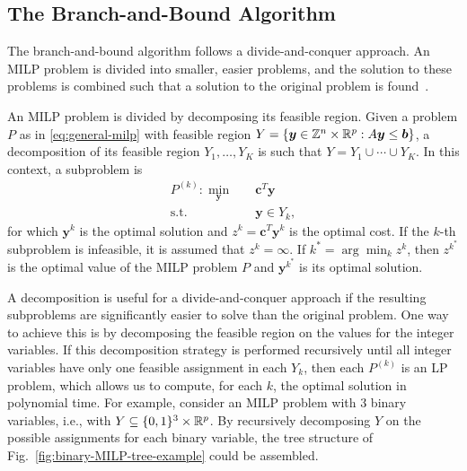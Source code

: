 	  \subsection{The Branch-and-Bound Algorithm}

	  The branch-and-bound algorithm follows a divide-and-conquer approach.
	  An MILP problem is divided into smaller, easier problems, and the
	  solution to these problems is combined such that a solution to the
	  original problem is found~\cite{wolseyIntegerProgramming1998}.

	  An MILP problem is divided by decomposing its feasible region.  Given
	  a problem $P$ as in \eqref{eq:general-milp} with feasible region
	  $Y=\{\bm{y}\in \mathbb{Z}^{n}\times \mathbb{R}^{p}: A\bm{y}\le \bm{b}\}$, a
	  decomposition of its feasible region $Y_1,\ldots,Y_K$ is such that
	  $Y=Y_1\cup \cdots\cup Y_K$.
In this context, a subproblem is
\begin{equation}\label{eq:milp-subproblem}
\begin{split}
    P^{(k)} : \min_{\bm{y}} \quad & \bm{c}^{T}\bm{y} \\
    \textrm{s.t.} \quad & \bm{y}\in Y_k
,\end{split}
\end{equation}
for which $\bm{y}^{k}$ is the optimal solution and $z^{k}=\bm{c}^{T}\bm{y}^{k}$ is the optimal cost.
If the $k$-th subproblem is infeasible, it is assumed that $z^{k}=\infty$.
If $k^{*}= \arg\min_k z^{k}$, then $z^{k^*}$ is the optimal value of the MILP problem $P$ and $\bm{y}^{k^*}$ is its optimal solution.

A decomposition is useful for a divide-and-conquer approach if the resulting subproblems are significantly easier to solve than the original problem.
One way to achieve this is by decomposing the feasible region on the values for the integer variables.
If this decomposition strategy is performed recursively until all integer variables have only one feasible assignment in each $Y_k$, then each $P^{(k)}$ is an LP problem, which allows us to compute, for each $k$, the optimal solution in polynomial time.
For example, consider an MILP problem with 3 binary variables, i.e., with $Y\subseteq \{0,1\}^{3}\times \mathbb{R}^{p}$.
By recursively decomposing $Y$ on the possible assignments for each binary variable, the tree structure of Fig.~\ref{fig:binary-MILP-tree-example} could be assembled.

